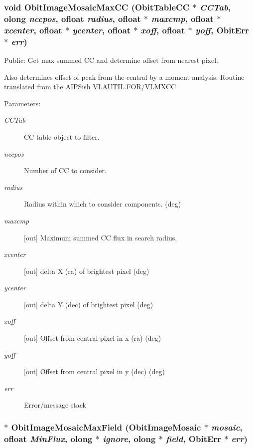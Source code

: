 \subsubsection{\setlength{\rightskip}{0pt plus 5cm}void Obit\-Image\-Mosaic\-Max\-CC ({\bf Obit\-Table\-CC} $\ast$ {\em CCTab}, {\bf olong} {\em nccpos}, {\bf ofloat} {\em radius}, {\bf ofloat} $\ast$ {\em maxcmp}, {\bf ofloat} $\ast$ {\em xcenter}, {\bf ofloat} $\ast$ {\em ycenter}, {\bf ofloat} $\ast$ {\em xoff}, {\bf ofloat} $\ast$ {\em yoff}, {\bf Obit\-Err} $\ast$ {\em err})}\label{ObitImageMosaic_8h_a23}


Public: Get max summed CC and determine offset from nearest pixel. 

Also determines offset of peak from the central by a moment analysis. Routine translated from the AIPSish VLAUTIL.FOR/VLMXCC \begin{Desc}
\item[Parameters:]
\begin{description}
\item[{\em CCTab}]CC table object to filter. \item[{\em nccpos}]Number of CC to consider. \item[{\em radius}]Radius within which to consider components. (deg) \item[{\em maxcmp}][out] Maximum summed CC flux in search radius. \item[{\em xcenter}][out] delta X (ra) of brightest pixel (deg) \item[{\em ycenter}][out] delta Y (dec) of brightest pixel (deg) \item[{\em xoff}][out] Offset from central pixel in x (ra) (deg) \item[{\em yoff}][out] Offset from central pixel in y (dec) (deg) \item[{\em err}]Error/message stack \end{description}
\end{Desc}
\subsubsection{$\ast$ Obit\-Image\-Mosaic\-Max\-Field ({\bf Obit\-Image\-Mosaic} $\ast$ {\em mosaic}, {\bf ofloat} {\em Min\-Flux}, {\bf olong} $\ast$ {\em ignore}, {\bf olong} $\ast$ {\em field}, {\bf Obit\-Err} $\ast$ {\em err})}\label{ObitImageMosaic_8h_a26}


